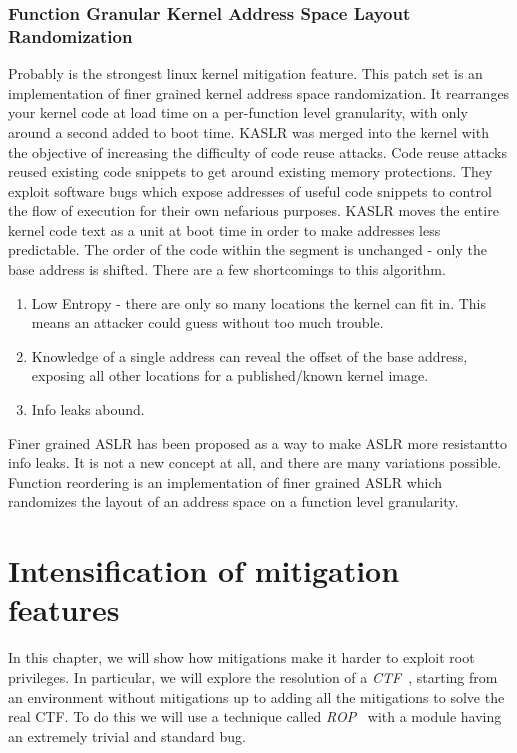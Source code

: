 \documentclass{masterthesis}
\begin{document}
\subsection{Function Granular Kernel Address Space Layout Randomization}
\label{subsect:FG-KASLR}
Probably is the strongest linux kernel mitigation feature.
This patch set is an implementation of finer grained kernel address space randomization. It rearranges your kernel code at load time on a per-function level granularity, with only around a second added to boot time.
KASLR was merged into the kernel with the objective of increasing the difficulty of code reuse attacks. Code reuse attacks reused existing code snippets to get around existing memory protections. They exploit software bugs which expose addresses of useful code snippets to control the flow of execution for their own nefarious purposes. KASLR moves the entire kernel
code text as a unit at boot time in order to make addresses less predictable.
The order of the code within the segment is unchanged - only the base address is shifted. There are a few shortcomings to this algorithm.\\
\begin{enumerate}
\item Low Entropy - there are only so many locations the kernel can fit in. This means an attacker could guess without too much trouble.
\item Knowledge of a single address can reveal the offset of the base address, exposing all other locations for a published/known kernel image.
\item Info leaks abound.
\end{enumerate}

Finer grained ASLR has been proposed as a way to make ASLR more resistantto info leaks. It is not a new concept at all, and there are many variations possible. Function reordering is an implementation of finer grained ASLR which randomizes the layout of an address space on a function level granularity.

\chapter{Intensification of mitigation features}
\label{ch:adding mitigation}
In this chapter, we will show how mitigations make it harder to exploit root privileges.
In particular, we will explore the resolution of a \emph{CTF}~\cite{hxp-CTF-2020-kernel-rop}, starting from an environment without mitigations up to adding all the mitigations to solve the real CTF.
To do this we will use a technique called \emph{ROP}~\cite{roemer2012return} with a module having an extremely trivial and standard bug.
\end{document}
